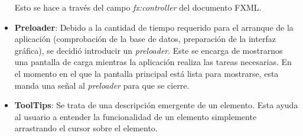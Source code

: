 \begin{itemize}
Esto se hace a través del campo \emph{fx:controller} del documento FXML.
\item
\textbf{Preloader}: Debido a la cantidad de tiempo requerido para el arranque de la aplicación (comprobación de la base de datos, preparación de la interfaz gráfica), se decidió introducir un \emph{preloader}. Este se encarga de mostrarnos una pantalla de carga mientras la aplicación realiza las tareas necesarias. En el momento en el que la pantalla principal está lista para mostrarse, esta manda una señal al \emph{preloader} para que se cierre.

\item
\textbf{ToolTips}: Se trata de una descripción emergente de un elemento. Esta ayuda al usuario a entender la funcionalidad de un elemento simplemente arrastrando el cursor sobre el elemento.


\end{itemize}


